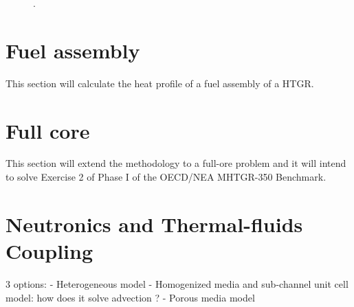 \begin{figure}[htbp!]
	\centering
	\hfill
    \caption{.}
	\label{fig:th-val-uni-results}
\end{figure}

\section{Fuel assembly}

This section will calculate the heat profile of a fuel assembly of a HTGR.

\section{Full core}

This section will extend the methodology to a full-ore problem and it will intend to solve Exercise 2 of Phase I of the OECD/NEA MHTGR-350 Benchmark.




\section{Neutronics and Thermal-fluids Coupling}

3 options:
- Heterogeneous model
- Homogenized media and sub-channel unit cell model: how does it solve advection ?
- Porous media model


